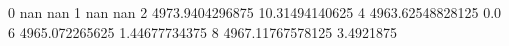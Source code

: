 0 nan nan
1 nan nan
2 4973.9404296875 10.31494140625
4 4963.62548828125 0.0
6 4965.072265625 1.44677734375
8 4967.11767578125 3.4921875
